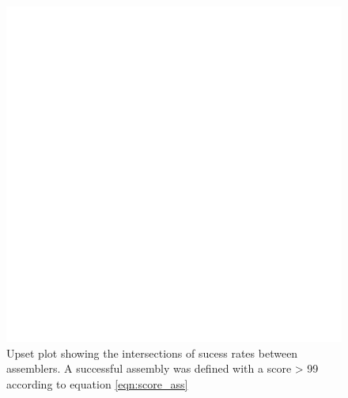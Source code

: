 \begin{figure}[H]
\centering
\includegraphics[height=.45\textheight, width=.95\textwidth]{Figures/upset}
\decoRule
\caption[Upset plot comparing the success rates of of all assemblers]{Upset plot showing the intersections of sucess rates between assemblers. A successful assembly was defined with a score > 99 according to equation \ref{eqn:score_ass}}
\label{fig:upset}
\end{figure}







